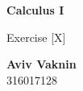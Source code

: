 \documentclass[a4paper, 12pt]{article}
\begin{document}
    \begin{center}
        \vspace*{4.4cm}
            
        \Huge
        \textbf{Calculus I}
            
        \vspace{0.5cm}
        \LARGE
        Exercise [X]

        \vfill
            
        \Large
        \textbf{Aviv Vaknin}\\316017128
                    
    \end{center}
\end{document}
